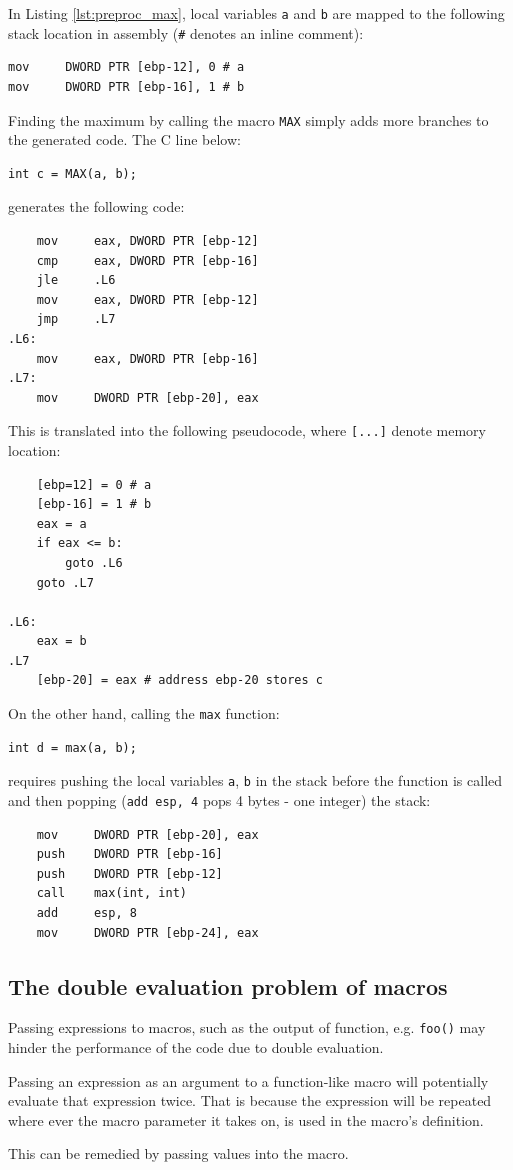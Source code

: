 In Listing \ref{lst:preproc_max}, local variables \texttt{a} and \texttt{b} are mapped to the following stack location in assembly (\texttt{\#} denotes an inline comment):
\begin{verbatim}
mov     DWORD PTR [ebp-12], 0 # a
mov     DWORD PTR [ebp-16], 1 # b
\end{verbatim}
Finding the maximum by calling the macro \texttt{MAX} simply adds more branches to the generated code. The C line below:
\begin{verbatim}
int c = MAX(a, b);
\end{verbatim}
generates the following code:
\begin{verbatim}
    mov     eax, DWORD PTR [ebp-12]
    cmp     eax, DWORD PTR [ebp-16]
    jle     .L6
    mov     eax, DWORD PTR [ebp-12]
    jmp     .L7
.L6:
    mov     eax, DWORD PTR [ebp-16]
.L7:
    mov     DWORD PTR [ebp-20], eax
\end{verbatim}
This is translated into the following pseudocode, where \texttt{[...]} denote memory location:
\begin{verbatim}
    [ebp=12] = 0 # a
    [ebp-16] = 1 # b
    eax = a
    if eax <= b:
        goto .L6
    goto .L7

.L6:
    eax = b
.L7
    [ebp-20] = eax # address ebp-20 stores c
\end{verbatim}
On the other hand, calling the \texttt{max} function:
\begin{verbatim}
int d = max(a, b);
\end{verbatim}
requires pushing the local variables \texttt{a}, \texttt{b} in the stack before the function is called and then popping (\texttt{add esp, 4} pops 4 bytes - one integer) the stack:
\begin{verbatim}
    mov     DWORD PTR [ebp-20], eax
    push    DWORD PTR [ebp-16]
    push    DWORD PTR [ebp-12]
    call    max(int, int)
    add     esp, 8
    mov     DWORD PTR [ebp-24], eax
\end{verbatim}


\subsection{The double evaluation problem of macros}

Passing expressions to macros, such as the output of function, e.g. \texttt{foo()} may hinder the performance of the code due to double evaluation.

\begin{takeaway}[double evaluation problem of macros]
Passing an expression as an argument to a function-like macro will potentially evaluate that expression twice. That is because the expression will be repeated where ever the macro parameter it takes on, is used in the macro's definition.
\end{takeaway}
This can be remedied by passing values into the macro.

